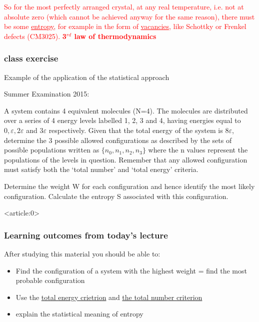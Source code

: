 \documentclass[ignorenonframetext]{beamer}
\begin{document}
\textcolor{red}{So for the most perfectly arranged crystal, at any real temperature, i.e. not at absolute zero (which cannot be achieved anyway for the same reason), there must be some \underline{entropy}, for example in the form of \underline{vacancies}, like Schottky or Frenkel defects (CM3025). \textbf{3\(^{rd}\) law of thermodynamics}}


\begin{frame}
\frametitle{class exercise}
Example of the application of the statistical approach

Summer Examination 2015:

A system contains 4 equivalent molecules (N=4). The molecules are distributed over a series of 4 energy levels labelled 1, 2, 3 and 4, having energies equal to \( 0, \varepsilon, 2\varepsilon\) and \(3\varepsilon\) respectively. Given that the total energy of the system is \(8\varepsilon\), determine the 3 possible allowed configurations as described by the sets of possible populations written as \(\{n_0, n_1, n_2, n_3\}\) where the n values represent the populations of the levels in question. Remember that any allowed configuration must satisfy both the ‘total number’ and ‘total energy’  criteria.

Determine the weight W for each configuration and hence identify the most likely configuration.  Calculate the entropy  S associated with this configuration.	
\end{frame}

\begin{frame}<article:0>
\frametitle{Learning outcomes from today's lecture}
After studying this material you should be able to:
\begin{itemize}
\item Find the configuration of a system with the highest weight = find the most probable configuration
\item Use the \underline{total energy crietrion} and \underline{the total number criterion}
\item explain the statistical meaning of entropy
\end{itemize}
\end{frame}

\end{document}
